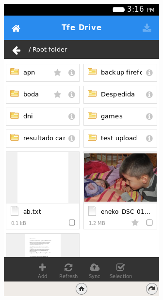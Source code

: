 \documentclass{beamer}
\begin{document}
\begin{frame}
\begin{center}
\includegraphics[scale=0.5] {./images/TFEDrive02.png} 
\end{center}
\end{frame}
\end{document}
